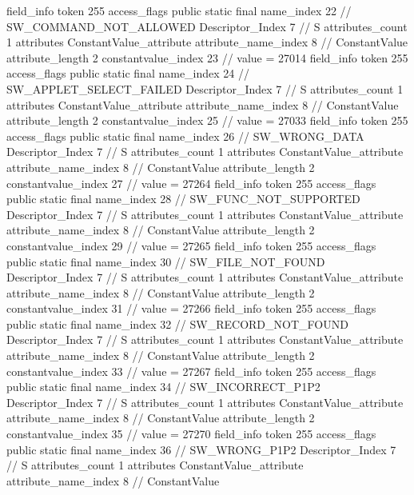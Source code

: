 {{{{{{				}
			}
			field_info {
				token	255
				access_flags	public static final
				name_index	22		// SW_COMMAND_NOT_ALLOWED
				Descriptor_Index	7		// S
				attributes_count	1
				attributes {
				ConstantValue_attribute {
					attribute_name_index	8		// ConstantValue
					attribute_length	2
					constantvalue_index	23		// value = 27014
				}
				}
			}
			field_info {
				token	255
				access_flags	public static final
				name_index	24		// SW_APPLET_SELECT_FAILED
				Descriptor_Index	7		// S
				attributes_count	1
				attributes {
				ConstantValue_attribute {
					attribute_name_index	8		// ConstantValue
					attribute_length	2
					constantvalue_index	25		// value = 27033
				}
				}
			}
			field_info {
				token	255
				access_flags	public static final
				name_index	26		// SW_WRONG_DATA
				Descriptor_Index	7		// S
				attributes_count	1
				attributes {
				ConstantValue_attribute {
					attribute_name_index	8		// ConstantValue
					attribute_length	2
					constantvalue_index	27		// value = 27264
				}
				}
			}
			field_info {
				token	255
				access_flags	public static final
				name_index	28		// SW_FUNC_NOT_SUPPORTED
				Descriptor_Index	7		// S
				attributes_count	1
				attributes {
				ConstantValue_attribute {
					attribute_name_index	8		// ConstantValue
					attribute_length	2
					constantvalue_index	29		// value = 27265
				}
				}
			}
			field_info {
				token	255
				access_flags	public static final
				name_index	30		// SW_FILE_NOT_FOUND
				Descriptor_Index	7		// S
				attributes_count	1
				attributes {
				ConstantValue_attribute {
					attribute_name_index	8		// ConstantValue
					attribute_length	2
					constantvalue_index	31		// value = 27266
				}
				}
			}
			field_info {
				token	255
				access_flags	public static final
				name_index	32		// SW_RECORD_NOT_FOUND
				Descriptor_Index	7		// S
				attributes_count	1
				attributes {
				ConstantValue_attribute {
					attribute_name_index	8		// ConstantValue
					attribute_length	2
					constantvalue_index	33		// value = 27267
				}
				}
			}
			field_info {
				token	255
				access_flags	public static final
				name_index	34		// SW_INCORRECT_P1P2
				Descriptor_Index	7		// S
				attributes_count	1
				attributes {
				ConstantValue_attribute {
					attribute_name_index	8		// ConstantValue
					attribute_length	2
					constantvalue_index	35		// value = 27270
				}
				}
			}
			field_info {
				token	255
				access_flags	public static final
				name_index	36		// SW_WRONG_P1P2
				Descriptor_Index	7		// S
				attributes_count	1
				attributes {
				ConstantValue_attribute {
					attribute_name_index	8		// ConstantValue
}}}}}}}
